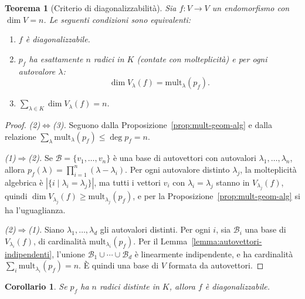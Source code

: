 \documentclass[11pt, a4paper]{book}
\theoremstyle{definition}
\theoremstyle{plain}
\newtheorem{teorema}[definizione]{Teorema}
\newtheorem{corollario}[definizione]{Corollario}
\theoremstyle{remark}
\begin{document}
\begin{teorema}[Criterio di diagonalizzabilità]
\label{thm:diagonalizzabilita}
Sia $f \colon V \to V$ un endomorfismo con $\dim V = n$. Le seguenti condizioni sono equivalenti:
\begin{enumerate}
  \item $f$ è diagonalizzabile.
  \item $p_f$ ha esattamente $n$ radici in $K$ (contate con molteplicità) e per ogni autovalore $\lambda$:
  \[
    \dim V_\lambda(f) = \mathrm{mult}_\lambda(p_f).
  \]
  \item $\displaystyle\sum_{\lambda \in K}\dim V_\lambda(f) = n$.
\end{enumerate}
\end{teorema}

\begin{proof}
\emph{(2)$\Leftrightarrow$(3).} Seguono dalla Proposizione~\ref{prop:mult-geom-alg} e dalla relazione $\sum_\lambda\mathrm{mult}_\lambda(p_f) \leq \deg p_f = n$.

\emph{(1)$\Rightarrow$(2).} Se $\mathcal{B}=\{v_1,\ldots,v_n\}$ è una base di autovettori con autovalori $\lambda_1,\ldots,\lambda_n$, allora $p_f(\lambda) = \prod_{i=1}^n(\lambda-\lambda_i)$. Per ogni autovalore distinto $\lambda_j$, la molteplicità algebrica è $|\{i \mid \lambda_i = \lambda_j\}|$, ma tutti i vettori $v_i$ con $\lambda_i = \lambda_j$ stanno in $V_{\lambda_j}(f)$, quindi $\dim V_{\lambda_j}(f) \geq \mathrm{mult}_{\lambda_j}(p_f)$, e per la Proposizione~\ref{prop:mult-geom-alg} si ha l'uguaglianza.

\emph{(2)$\Rightarrow$(1).} Siano $\lambda_1,\ldots,\lambda_d$ gli autovalori distinti. Per ogni $i$, sia $\mathcal{B}_i$ una base di $V_{\lambda_i}(f)$, di cardinalità $\mathrm{mult}_{\lambda_i}(p_f)$. Per il Lemma~\ref{lemma:autovettori-indipendenti}, l'unione $\mathcal{B}_1 \cup \cdots \cup \mathcal{B}_d$ è linearmente indipendente, e ha cardinalità $\sum_i \mathrm{mult}_{\lambda_i}(p_f) = n$. È quindi una base di $V$ formata da autovettori.
\end{proof}

\begin{corollario}
Se $p_f$ ha $n$ radici distinte in $K$, allora $f$ è diagonalizzabile.
\end{corollario}
\end{document}
